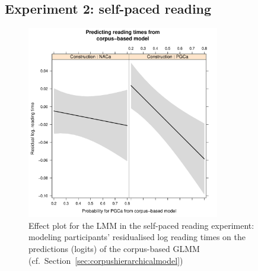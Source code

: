 \documentclass[USenglish]{article}
\begin{document}

\subsection{Experiment 2: self-paced reading}


\begin{figure}[h]
\centering
\includegraphics[width=0.75\textwidth]{../R/output/spr_effects}
\caption{Effect plot for the LMM in the self-paced reading experiment: modeling participants' residualised log reading times on the predictions (logits) of the corpus-based GLMM (cf.\ Section~\ref{sec:corpushierarchicalmodel})}
\label{fig:spr:continuous:effects}
\end{figure}



\end{document}

